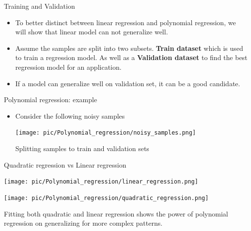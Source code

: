 \documentclass[serif, aspectratio=169]{beamer}
\begin{document}
\begin{frame}{Training and Validation}
    \begin{itemize}
        \item To better distinct between linear regression and polynomial regression, we will show that linear model can not generalize well.
        \item Assume the samples are split into two subsets. \textbf{Train dataset} which is used to train a regression model. As well as a \textbf{Validation dataset} to find the best regression model for an application.
        \item If a model can generalize well on validation set, it can be a good candidate.
    \end{itemize}
\end{frame}

\begin{frame}{Polynomial regression: example}
    \begin{itemize}
        \item Consider the following noisy samples
        \begin{center}
            \texttt{[image: pic/Polynomial\_regression/noisy\_samples.png]}
        \end{center}
        \vfile
        \begin{center}
            Splitting samples to train and validation sets
        \end{center}
    \end{itemize}
\end{frame}

\begin{frame}{Quadratic regression vs Linear regression}
    \begin{minipage}{0.48\textwidth}
        \centering
        \texttt{[image: pic/Polynomial\_regression/linear\_regression.png]}
    \end{minipage} %
    \begin{minipage}{0.48\textwidth}
        \centering
        \texttt{[image: pic/Polynomial\_regression/quadratic\_regression.png]}
    \end{minipage}
    \vfile
    \begin{center}
        Fitting both quadratic and linear regression shows the power of polynomial regression on generalizing for more complex patterns.
    \end{center}
\end{frame}

\end{document}
